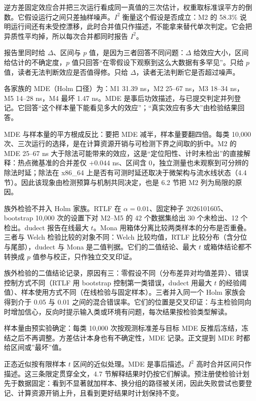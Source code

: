 逆方差固定效应合并把三次运行看成同一真值的三次估计，权重取标准误平方的倒数。它假设运行之间只差抽样噪声。$I^2$ 衡量这个假设是否成立：M2 的 58.3\% 说明运行间还有未受控漂移，此时合并值只作描述，不能拿来替代单次判定。它会把异质性平均掉，所以每次合并都同时报告 $I^2$。

报告里同时给 $\Delta$、区间与 $p$ 值，是因为三者回答不同问题：$\Delta$ 给效应大小，区间给估计的不确定度，$p$ 值只回答“在零假设下观察到这么大数据有多罕见”。只给 $p$ 值，读者无法判断效应是否值得修。只给 $\Delta$，读者无法判断它是否超过噪声。

各家族的 MDE（Holm 口径）为：M1 31.39 ns，M2 25--67 ns，M3 18--34 ns，M5 14--28 ns，M4 最坏 1.47 ns。MDE 是事后功效描述，与已提交判定并列登记。它回答“这个样本量下能看见多大的效应”；“真实效应有多大”由检验结果回答。 %

MDE 与样本量的平方根成反比：要把 MDE 减半，样本量要翻四倍。每类 10,000 次、三次运行的选择，是在计算资源开销与可检测下界之间取的折中。M2 的 MDE 25--67 ns 大于除法可能带来的效应，这是“定位阳性、计时未检出”的直接解释：热点微基准的合并差仅 $+0.044$ ns、区间含 0，独立测量也未观察到可分辨的除法时延；除法在 x86\_64 上是否有可测时延还取决于微架构与流水线状态（4.4 节）。因此该现象由检测预算与机制共同决定，也是 6.2 节把 M2 列为局限的原因。

族外检验不并入 Holm 家族。RTLF 在 $\alpha=0.01$、固定种子 2026101605、bootstrap 10,000 次的设置下对 M2--M5 的 42 个数据集给出 30 个未检出、12 个检出\cite{rtlf}。dudect 报告在线最大 $t$\cite{dudect}。Mona 用箱体分离比较两类样本的分布是否重叠。三者与 Welch 检验比较的对象不同：Welch 比较均值，RTLF 比较分布（含分位与尾部），dudect 与 Mona 是二值判据。它们的二值结论、最大 $t$ 或箱体结论都不转换成 $p$ 值参与校正，只作独立交叉印证。 %

族外检验的二值结论记录，原因有三：零假设不同（分布差异对均值差异）、错误控制方式不同（RTLF 用 bootstrap 控制第一类错误，dudect 用最大 $t$ 的经验阈值）、样本使用方式不同（在线检验与固定样本）。三者并入同一个 Holm 家族会得到介于 0.05 与 0.01 之间的混合错误率。它们的位置是交叉印证：与主检验同向时增加信心，反向时提示输入类或环境有问题，每次结果按检验类型解读。

样本量由预实验确定：每类 10,000 次按观测标准差与目标 MDE 反推后冻结，冻结之后不再调整。方差估计本身也有不确定性，MDE 记录。正文提到 MDE 时都给区间或”最坏”值。

正态近似按有限样本 $t$ 区间的近似处理。MDE 是事后描述。$I^2$ 高时合并区间只作描述。这三条限定贯穿全文，4.7 节解释结果时仍按它们解读。预注册使检验计划先于数据固定：看到不显著就加样本、换分组的路径被关闭，因此失败尝试也要登记、计算资源开销上升，且看到更好结果时计划保持不变。

